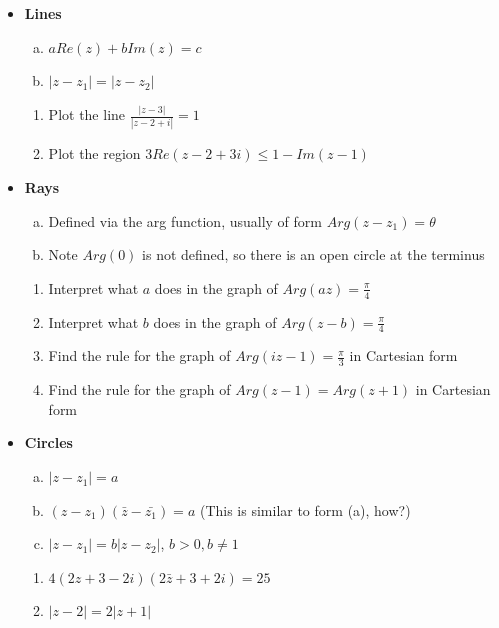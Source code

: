 \documentclass[12pt]{article}
\begin{document}
\begin{itemize}
    \item \textbf{Lines}
    \begin{enumerate}[(a)]
        \item $a Re(z) + b Im(z) = c$
        \item $| z - z_{1} | = | z - z_{2} |$
    \end{enumerate}
    \begin{enumerate}
            \item Plot the line $\frac{| z - 3 |}{| z - 2 + i |} = 1$
            \vspace{2cm}
            \item Plot the region $3 Re(z - 2 + 3i) \leq 1 - Im(z - 1)$
            \vspace{2cm}
        \end{enumerate}
    \item \textbf{Rays}
    \begin{enumerate}[(a)]
        \item Defined via the arg function, usually of form $Arg(z-z_{1}) = \theta $
        \item Note $Arg(0)$ is not defined, so there is an open circle at the terminus
    \end{enumerate}
    \begin{enumerate}        
        \item Interpret what $a$ does in the graph of $Arg(az) = \frac{\pi}{4}$
        \vspace{2cm}
        \item Interpret what $b$ does in the graph of $Arg(z - b) = \frac{\pi}{4}$
        \vspace{2cm}
        \item Find the rule for the graph of $Arg(iz - 1) = \frac{\pi}{3}$ in Cartesian form
        \vspace{2cm}
        \item Find the rule for the graph of $Arg(z - 1) = Arg(z + 1)$ in Cartesian form
        \vspace{3cm}
    \end{enumerate}
    \item \textbf{Circles}
    \begin{enumerate}[(a)]
        \item $| z - z_{1} | = a$
        \item $(z - z_{1})(\bar{z} - \bar{z_{1}}) = a$ (This is similar to form (a), how?)
        \item $| z - z_{1} | = b | z - z_{2} |$, $b > 0, b \neq 1$
    \end{enumerate}
    \begin{enumerate}
        \item $4(2z + 3 - 2i)(2\bar{z} + 3 + 2i) = 25$
        \vspace{2cm}
        \item $|z - 2| = 2|z + 1|$
        \vspace{2cm}
    \end{enumerate}
\end{itemize}
\end{document}
